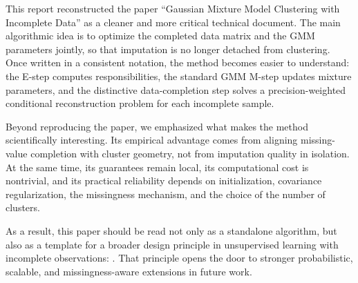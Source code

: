 This report reconstructed the paper ``Gaussian Mixture Model Clustering with Incomplete Data'' as a cleaner and more critical technical document. The main algorithmic idea is to optimize the completed data matrix and the GMM parameters jointly, so that imputation is no longer detached from clustering. Once written in a consistent notation, the method becomes easier to understand: the E-step computes responsibilities, the standard GMM M-step updates mixture parameters, and the distinctive data-completion step solves a precision-weighted conditional reconstruction problem for each incomplete sample.

Beyond reproducing the paper, we emphasized what makes the method scientifically interesting. Its empirical advantage comes from aligning missing-value completion with cluster geometry, not from imputation quality in isolation. At the same time, its guarantees remain local, its computational cost is nontrivial, and its practical reliability depends on initialization, covariance regularization, the missingness mechanism, and the choice of the number of clusters.

As a result, this paper should be read not only as a standalone algorithm, but also as a template for a broader design principle in unsupervised learning with incomplete observations: . That principle opens the door to stronger probabilistic, scalable, and missingness-aware extensions in future work.
